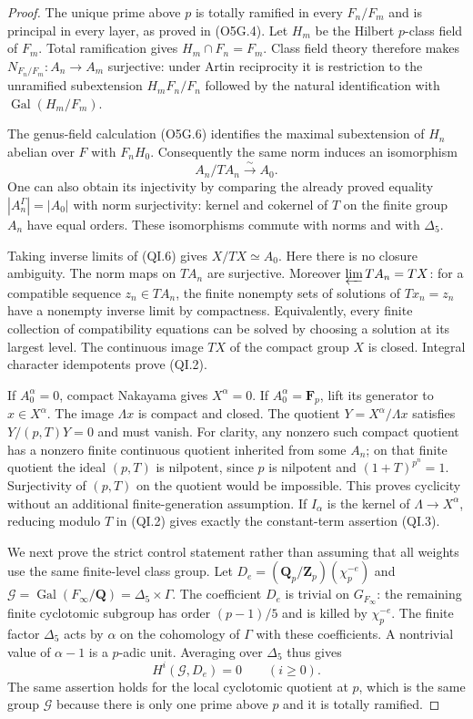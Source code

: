 \begin{proof}
The unique prime above $p$ is totally ramified in every
$F_n/F_m$ and is principal in every layer, as proved in (O5G.4).
Let $H_m$ be the Hilbert $p$-class field of $F_m$.
Total ramification gives $H_m\cap F_n=F_m$.  Class field theory
therefore makes $N_{F_n/F_m}:A_n\to A_m$ surjective: under
Artin reciprocity it is restriction to the unramified subextension
$H_mF_n/F_n$ followed by the natural identification with
$\operatorname{Gal}(H_m/F_m)$.

The genus-field calculation (O5G.6) identifies the maximal
subextension of $H_n$ abelian over $F$ with $F_nH_0$.
Consequently the same norm induces an isomorphism
\[
                 A_n/TA_n\xrightarrow{\ \sim\ }A_0.
 \tag{QI.6}
\]
One can also obtain its injectivity by comparing the already
proved equality $|A_n^{\Gamma}|=|A_0|$ with norm surjectivity:
kernel and cokernel of $T$ on the finite group $A_n$ have equal
orders.  These isomorphisms commute with norms and with $\Delta_5$.

Taking inverse limits of (QI.6) gives $X/TX\simeq A_0$.
Here there is no closure ambiguity.  The norm maps on $TA_n$
are surjective.  Moreover $\varprojlim TA_n=TX$: for a compatible
sequence $z_n\in TA_n$, the finite nonempty sets of solutions
of $Tx_n=z_n$ have a nonempty inverse limit by compactness.
Equivalently, every finite collection of compatibility equations
can be solved by choosing a solution at its largest level.
The continuous image $TX$ of the compact group $X$ is closed.
Integral character idempotents prove (QI.2).

If $A_0^\alpha=0$, compact Nakayama gives $X^\alpha=0$.
If $A_0^\alpha=\mathbf F_p$, lift its generator to $x\in X^\alpha$.
The image $\Lambda x$ is compact and closed.  The quotient
$Y=X^\alpha/\Lambda x$ satisfies $Y/(p,T)Y=0$ and must vanish.
For clarity, any nonzero such compact quotient has a nonzero
finite continuous quotient inherited from some $A_n$; on that
finite quotient the ideal $(p,T)$ is nilpotent, since $p$ is
nilpotent and $(1+T)^{p^n}=1$.  Surjectivity of $(p,T)$ on
the quotient would be impossible.  This proves cyclicity without
an additional finite-generation assumption.  If $I_\alpha$ is
the kernel of $\Lambda\to X^\alpha$, reducing modulo $T$ in
(QI.2) gives exactly the constant-term assertion (QI.3).

We next prove the strict control statement rather than assuming
that all weights use the same finite-level class group.
Let $D_e=(\mathbf Q_p/\mathbf Z_p)(\chi_p^{-e})$ and
$\mathcal G=\operatorname{Gal}(F_\infty/\mathbf Q)
 =\Delta_5\times\Gamma$.  The coefficient $D_e$ is trivial on
$G_{F_\infty}$: the remaining finite cyclotomic subgroup has
order $(p-1)/5$ and is killed by $\chi_p^{-e}$.
The finite factor $\Delta_5$ acts by $\alpha$ on the cohomology
of $\Gamma$ with these coefficients.  A nontrivial value of
$\alpha-1$ is a $p$-adic unit.  Averaging over $\Delta_5$ thus
gives
\[
                  H^i(\mathcal G,D_e)=0\qquad(i\ge0).
 \tag{QI.7}
\]
The same assertion holds for the local cyclotomic quotient at
$p$, which is the same group $\mathcal G$ because there is only
one prime above $p$ and it is totally ramified.


\end{proof}
